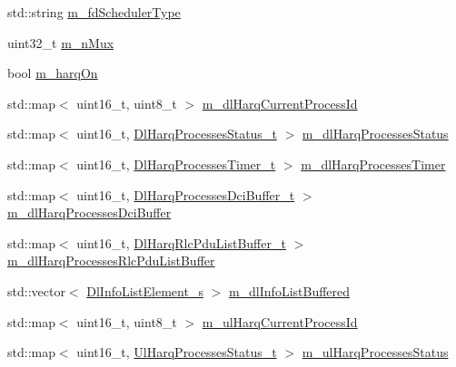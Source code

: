 \begin{DoxyCompactItemize}
\item 
std\+::string \hyperlink{classns3_1_1PssFfMacScheduler_a8442a089f3cb7fcaf802fb5da9caee02}{m\+\_\+fd\+Scheduler\+Type}
\item 
uint32\+\_\+t \hyperlink{classns3_1_1PssFfMacScheduler_a5f2880c5cc34c2189db6e92bc2cae47e}{m\+\_\+n\+Mux}
\item 
bool \hyperlink{classns3_1_1PssFfMacScheduler_a7163e6149892abe4c17ce95be6bf1953}{m\+\_\+harq\+On}
\item 
std\+::map$<$ uint16\+\_\+t, uint8\+\_\+t $>$ \hyperlink{classns3_1_1PssFfMacScheduler_a860dc1e5d114893e493e5ff2696d7171}{m\+\_\+dl\+Harq\+Current\+Process\+Id}
\item 
std\+::map$<$ uint16\+\_\+t, \hyperlink{namespacens3_a457b3571b67ff17d042e9894e90e2ce2}{Dl\+Harq\+Processes\+Status\+\_\+t} $>$ \hyperlink{classns3_1_1PssFfMacScheduler_aaddeb3fa864cb82b5829d4ca1cf9abea}{m\+\_\+dl\+Harq\+Processes\+Status}
\item 
std\+::map$<$ uint16\+\_\+t, \hyperlink{namespacens3_a39413ade536de4b1c82d6c0074cc703e}{Dl\+Harq\+Processes\+Timer\+\_\+t} $>$ \hyperlink{classns3_1_1PssFfMacScheduler_afcae17e3f08b0a6f1e1458a39da8cdcb}{m\+\_\+dl\+Harq\+Processes\+Timer}
\item 
std\+::map$<$ uint16\+\_\+t, \hyperlink{namespacens3_af25599bf8f9f564075c005759c9af18c}{Dl\+Harq\+Processes\+Dci\+Buffer\+\_\+t} $>$ \hyperlink{classns3_1_1PssFfMacScheduler_a167441dd2a0e5cde664eedfd19a07fbf}{m\+\_\+dl\+Harq\+Processes\+Dci\+Buffer}
\item 
std\+::map$<$ uint16\+\_\+t, \hyperlink{namespacens3_a4c0cbd1e72f1c667f8b5879655f13210}{Dl\+Harq\+Rlc\+Pdu\+List\+Buffer\+\_\+t} $>$ \hyperlink{classns3_1_1PssFfMacScheduler_a0f31f16c2a9f067c6189462a9797e06b}{m\+\_\+dl\+Harq\+Processes\+Rlc\+Pdu\+List\+Buffer}
\item 
std\+::vector$<$ \hyperlink{structns3_1_1DlInfoListElement__s}{Dl\+Info\+List\+Element\+\_\+s} $>$ \hyperlink{classns3_1_1PssFfMacScheduler_a3a7d9c7460c66767201d15a1d6f58758}{m\+\_\+dl\+Info\+List\+Buffered}
\item 
std\+::map$<$ uint16\+\_\+t, uint8\+\_\+t $>$ \hyperlink{classns3_1_1PssFfMacScheduler_a9e2a7c8f3e5e48aa429a5a06f4f70a72}{m\+\_\+ul\+Harq\+Current\+Process\+Id}
\item 
std\+::map$<$ uint16\+\_\+t, \hyperlink{namespacens3_af765c4daaafe4ea4809c1041fc196629}{Ul\+Harq\+Processes\+Status\+\_\+t} $>$ \hyperlink{classns3_1_1PssFfMacScheduler_a80badd341a079bd237ef7fe60db2cb79}{m\+\_\+ul\+Harq\+Processes\+Status}
\item 

\end{DoxyCompactItemize}
